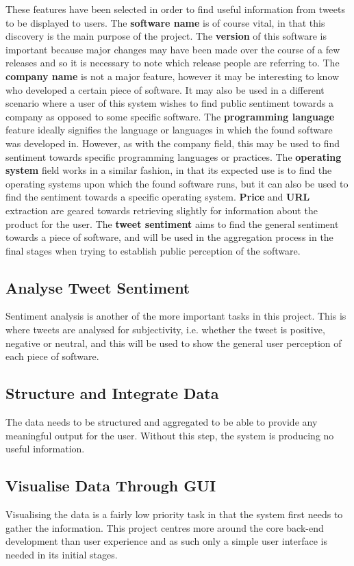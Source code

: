 These features have been selected in order to find useful information from tweets to be displayed to users. The \textbf{software name} is of course vital, in that this discovery is the main purpose of the project. The \textbf{version} of this software is important because major changes may have been made over the course of a few releases and so it is necessary to note which release people are referring to. The \textbf{company name} is not a major feature, however it may be interesting to know who developed a certain piece of software. It may also be used in a different scenario where a user of this system wishes to find public sentiment towards a company as opposed to some specific software. The \textbf{programming language} feature ideally signifies the language or languages in which the found software was developed in. However, as with the company field, this may be used to find sentiment towards specific programming languages or practices. The \textbf{operating system} field works in a similar fashion, in that its expected use is to find the operating systems upon which the found software runs, but it can also be used to find the sentiment towards a specific operating system. \textbf{Price} and \textbf{URL} extraction are geared towards retrieving slightly for information about the product for the user. The \textbf{tweet sentiment} aims to find the general sentiment towards a piece of software, and will be used in the aggregation process in the final stages when trying to establish public perception of the software.

\subsection{Analyse Tweet Sentiment}
Sentiment analysis is another of the more important tasks in this project. This is where tweets are analysed for subjectivity, i.e. whether the tweet is positive, negative or neutral, and this will be used to show the general user perception of each piece of software.

\subsection{Structure and Integrate Data}
The data needs to be structured and aggregated to be able to provide any meaningful output for the user. Without this step, the system is producing no useful information.

\subsection{Visualise Data Through GUI}
Visualising the data is a fairly low priority task in that the system first needs to gather the information. This project centres more around the core back-end development than user experience and as such only a simple user interface is needed in its initial stages.

